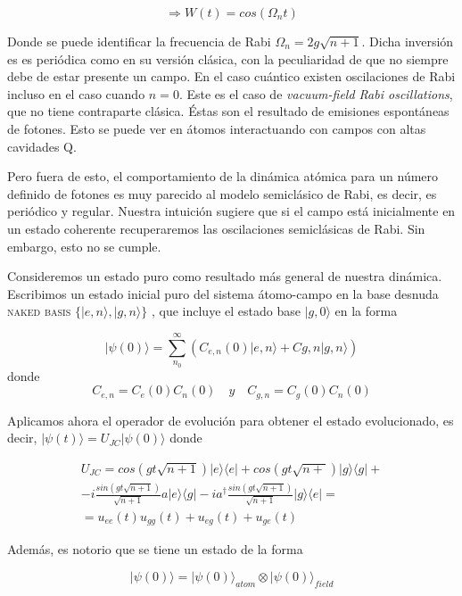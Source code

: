 \documentclass[spanish]{article}
\begin{document}
$$ \Rightarrow W(t) = cos(\Omega_n t) $$

Donde se puede identificar la frecuencia de Rabi $\Omega_n = 2 g\sqrt{n+1}$. Dicha inversión es es periódica como en su versión clásica, con la peculiaridad de que no siempre debe de estar presente un campo. En el caso cuántico existen oscilaciones de Rabi incluso en el caso cuando $n=0$. Este es el caso de \textit{vacuum-field Rabi oscillations}, que no tiene contraparte clásica. Éstas son el resultado de emisiones espontáneas de fotones. Esto se puede ver en átomos interactuando con campos con altas cavidades Q. 

	Pero fuera de esto, el comportamiento de la dinámica atómica para un número definido de fotones es muy parecido al modelo semiclásico de Rabi, es decir, es periódico y regular. Nuestra intuición sugiere que si el campo está inicialmente en un estado coherente recuperaremos las oscilaciones semiclásicas de Rabi. Sin embargo, esto no se cumple. 
	
		Consideremos un estado puro como resultado más general de nuestra dinámica. Escribimos un estado inicial puro del sistema átomo-campo en la base desnuda \textsc{naked basis} $\{ |e,n\rangle , |g,n\rangle \}$ , que incluye el estado base $|g,0\rangle$ en la forma 
		
\begin{equation}
|\psi(0)\rangle= \sum_{n_0}^\infty ( C_{e,n}(0) |e,n\rangle + C{g,n}|g,n\rangle)
\end{equation}
donde
$$ C_{e,n} = C_e(0)C_n(0) \quad y \quad C_{g,n} = C_g(0)C_n(0) $$

Aplicamos ahora el operador de evolución para obtener el estado evolucionado, es decir, $|\psi(t)\rangle = U_{JC}|\psi(0)\rangle$ donde 

\begin{equation}
\begin{split}
U_{JC} = cos(gt\sqrt{n+1})|e\rangle \langle e|+cos(gt\sqrt{n+})|g\rangle \langle g|+  \\
-i\frac{sin(gt\sqrt{n+1})}{\sqrt{n+1}}a|e\rangle \langle g| -i a^\dagger\frac{sin(gt\sqrt{n+1})}{\sqrt{n+1}}|g\rangle \langle e| = \\
= u_{ee}(t)u_{gg}(t)+u_{eg}(t)+u_{ge}(t)
\end{split}
\label{evol}
\end{equation}

Además, es notorio que se tiene un estado de la forma 

$$ |\psi(0)\rangle = |\psi(0)\rangle_{atom} \otimes |\psi(0)\rangle_{field} $$
\end{document}

